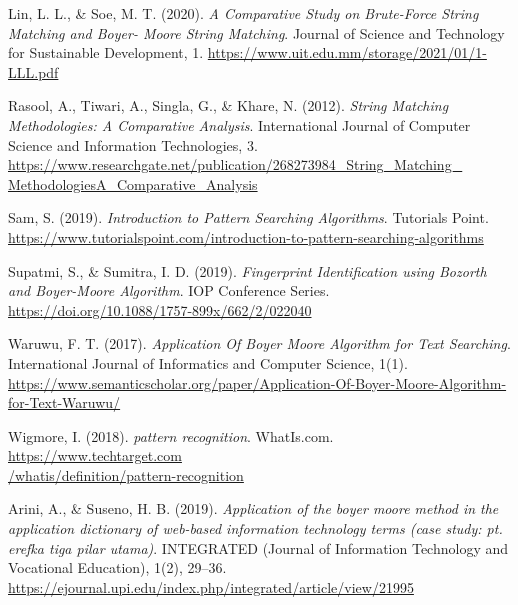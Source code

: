 \begin{thebibliography}{30}
    Lin, L. L., \& Soe, M. T. (2020). \emph{A Comparative Study on Brute-Force String Matching and
    Boyer- Moore String Matching}. Journal of Science and Technology for Sustainable Development, 1.
    \href{https://www.uit.edu.mm/storage/2021/01/1-LLL.pdf}{https://www.uit.edu.mm/storage/2021/01/1-LLL.pdf}

    Rasool, A., Tiwari, A., Singla, G., \& Khare, N. (2012). \emph{String Matching Methodologies: A
    Comparative Analysis}. International Journal of Computer Science and Information Technologies, 3. 
    \href{https://www.researchgate.net/publication/268273984_String_Matching_MethodologiesA_Comparative_Analysis}{https://www.researchgate.net/publication/268273984\_String\_Matching\_\\MethodologiesA\_Comparative\_Analysis}

    Sam, S. (2019). \emph{Introduction to Pattern Searching Algorithms}. Tutorials Point.
    \href{https://www.tutorialspoint.com/introduction-to-pattern-searching-algorithms#:~:text=Pattern\%20Searching\%20algorithms\%20are\%20used,task\%20for\%20a\%20longer\%20text}{https://www.tutorialspoint.com/introduction-to-pattern-searching-algorithms}

    Supatmi, S., \& Sumitra, I. D. (2019). \emph{Fingerprint Identification using Bozorth and
    Boyer-Moore Algorithm}. IOP Conference Series.
    \href{https://doi.org/10.1088/1757-899x/662/2/022040}{https://doi.org/10.1088/1757-899x/662/2/022040}

    Waruwu, F. T. (2017). \emph{Application Of Boyer Moore Algorithm for Text Searching}.
    International Journal of Informatics and Computer Science, 1(1).
    \href{https://www.semanticscholar.org/paper/Application-Of-Boyer-Moore-Algorithm-for-Text-Waruwu/423dcabcd3c5a5e5187f33726114d98e51c14a5c}{https://www.semanticscholar.org/paper/Application-Of-Boyer-Moore-Algorithm-for-Text-Waruwu/}

    Wigmore, I. (2018). \emph{pattern recognition}. WhatIs.com.
    \href{https://www.techtarget.com/whatis/definition/pattern-recognition}{https://www.techtarget.com\\/whatis/definition/pattern-recognition}

    Arini, A., \& Suseno, H. B. (2019). \emph{Application of the boyer moore method in the
        application dictionary of web-based information technology terms (case study: pt. erefka
    tiga pilar utama)}. INTEGRATED (Journal of Information Technology and Vocational Education),
    1(2), 29–36. \href{https://ejournal.upi.edu/index.php/integrated/article/view/21995}{https://ejournal.upi.edu/index.php/integrated/article/view/21995}


\end{thebibliography}
